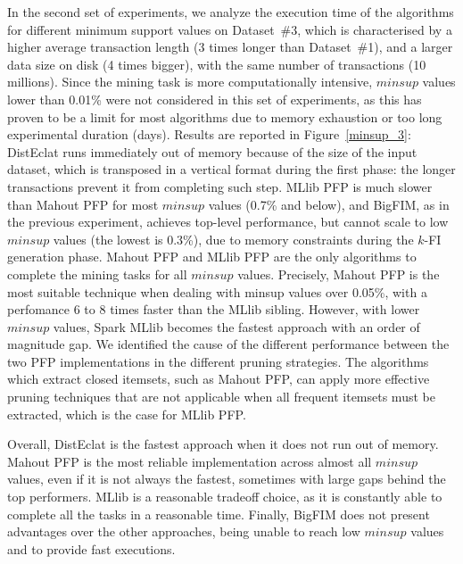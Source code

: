 In the second set of experiments, we analyze the execution time of
the algorithms for different minimum support values on Dataset~\#3,
which is characterised by a higher average transaction length
(3 times longer than Dataset~\#1),
and a larger data size on disk (4 times bigger),
with the same number of transactions (10 millions).
Since the mining task is more computationally intensive,
$minsup$ values lower than 0.01\% were
not considered in this set of experiments,
as this has proven to be a limit for most algorithms
due to memory exhaustion or too long experimental duration (days).
Results are reported in Figure~\ref{minsup_3}:
DistEclat runs immediately out of memory
because of the size of the input dataset,
which is transposed in a vertical format during the first phase:
the longer transactions prevent it from completing such step.
MLlib PFP is much slower than Mahout PFP for most $minsup$ values (0.7\% and below),
and BigFIM, as in the previous experiment,
achieves top-level performance, but cannot scale to low $minsup$ values
(the lowest is 0.3\%),
due to memory constraints during the $k$-FI generation phase.
Mahout PFP and MLlib PFP are the only algorithms
to complete the mining tasks for all $minsup$ values.
Precisely,
Mahout PFP is the most suitable technique
when dealing with minsup values over 0.05\%,
with a perfomance 6 to 8 times faster than the MLlib sibling.
However, with lower $minsup$ values,
Spark MLlib becomes the fastest approach with an order of magnitude gap.
We identified the cause of the different performance
between the two PFP implementations
in the different pruning strategies.
The algorithms which extract closed itemsets, such as Mahout PFP,
can apply more effective pruning techniques
that are not applicable when all frequent itemsets must be extracted,
which is the case for MLlib PFP.


Overall,
DistEclat is the fastest approach when it does not run out of memory.
Mahout PFP is the most reliable implementation across almost all $minsup$ values,
even if it is not always the fastest,
sometimes with large gaps behind the top performers.
MLlib is a reasonable tradeoff choice,
as it is constantly able to complete all the tasks in a reasonable time.
Finally, BigFIM does not present advantages over the other approaches,
being unable to reach low $minsup$ values and to provide fast executions.

